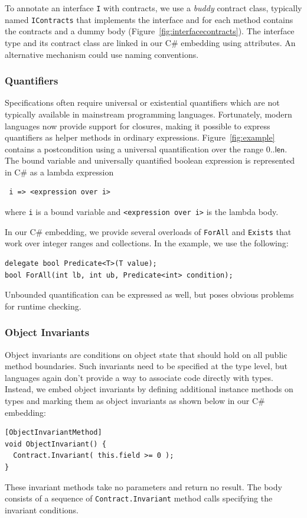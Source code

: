 \documentclass{sig-alternate}
\newcommand{\csharp}{C\#}
\begin{document}
To annotate an interface \lstinline{I} with contracts, we use a \emph{buddy}
contract class, typically named \lstinline{IContracts} that implements
the interface and for each method contains the contracts and a dummy
body (Figure~\ref{fig:interfacecontracts}).
The interface type and its contract class are linked in our \csharp{}
embedding using attributes. An alternative mechanism could use naming conventions.

\subsubsection{Quantifiers}
\noindent
Specifications often require universal or existential quantifiers
which are not typically available in mainstream programming
languages. Fortunately, modern languages now provide support for
closures, making it possible to express quantifiers as helper methods
in ordinary expressions. Figure~\ref{fig:example} contains a
postcondition using a universal quantification over the range
$0..\mathsf{len}$. The bound variable and universally quantified
boolean expression is represented in \csharp{} as a lambda expression 
\begin{lstlisting}
 i => <expression over i>
\end{lstlisting}
where \lstinline{i} is a bound variable and
 \lstinline{<expression over i>}
is the lambda body.

In our \csharp{} embedding, we provide several overloads of
\lstinline{ForAll} and \lstinline{Exists} that work over integer
ranges and collections. In the example, we use the following:
\begin{lstlisting}
delegate bool Predicate<T>(T value);
bool ForAll(int lb, int ub, Predicate<int> condition);
\end{lstlisting}
Unbounded quantification can be
expressed as well, but poses obvious problems for runtime checking.

\subsubsection{Object Invariants}
\noindent
Object invariants are conditions on object state that should hold on
all public method boundaries. Such invariants need to be specified at
the type level, but languages again don't provide a way to associate
code directly with types. Instead, we embed object invariants by
defining additional instance methods on types and marking them as object
invariants as shown below in our \csharp{} embedding:
\begin{lstlisting}
[ObjectInvariantMethod]
void ObjectInvariant() {
  Contract.Invariant( this.field >= 0 );
}
\end{lstlisting}
These invariant methods take no parameters and return no result. The
body consists of a sequence of \lstinline{Contract.Invariant} method
calls specifying the invariant conditions.
\end{document}
